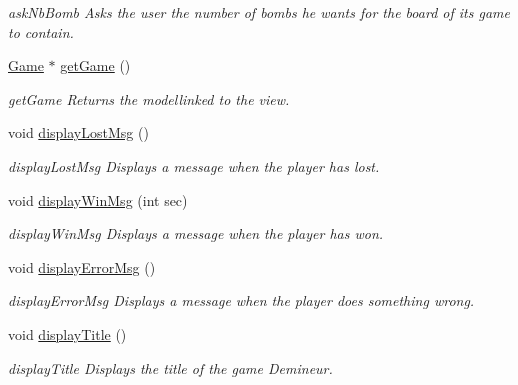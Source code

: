 \begin{DoxyCompactItemize}
\begin{DoxyCompactList}\small\item\em ask\+Nb\+Bomb Asks the user the number of bombs he wants for the board of its game to contain. \end{DoxyCompactList}\item 
\hyperlink{class_game}{Game} $\ast$ \hyperlink{class_view_a5ee79a88b93db7f3be74ece8aeeb492a}{get\+Game} ()
\begin{DoxyCompactList}\small\item\em get\+Game Returns the modellinked to the view. \end{DoxyCompactList}\item 
\mbox{\label{class_view_a65d71e0b2fefdd22cb097137cd501f38}} 
void \hyperlink{class_view_a65d71e0b2fefdd22cb097137cd501f38}{display\+Lost\+Msg} ()
\begin{DoxyCompactList}\small\item\em display\+Lost\+Msg Displays a message when the player has lost. \end{DoxyCompactList}\item 
\mbox{\label{class_view_a5cd02462388990e81f6372280ff85b9f}} 
void \hyperlink{class_view_a5cd02462388990e81f6372280ff85b9f}{display\+Win\+Msg} (int sec)
\begin{DoxyCompactList}\small\item\em display\+Win\+Msg Displays a message when the player has won. \end{DoxyCompactList}\item 
\mbox{\label{class_view_abfc9cf460ab368e82669bfb465a76efc}} 
void \hyperlink{class_view_abfc9cf460ab368e82669bfb465a76efc}{display\+Error\+Msg} ()
\begin{DoxyCompactList}\small\item\em display\+Error\+Msg Displays a message when the player does something wrong. \end{DoxyCompactList}\item 
\mbox{\label{class_view_a4684e5cb232e13c80d86b1c98deb416d}} 
void \hyperlink{class_view_a4684e5cb232e13c80d86b1c98deb416d}{display\+Title} ()
\begin{DoxyCompactList}\small\item\em display\+Title Displays the title of the game Demineur. \end{DoxyCompactList}\item 

\end{DoxyCompactItemize}
